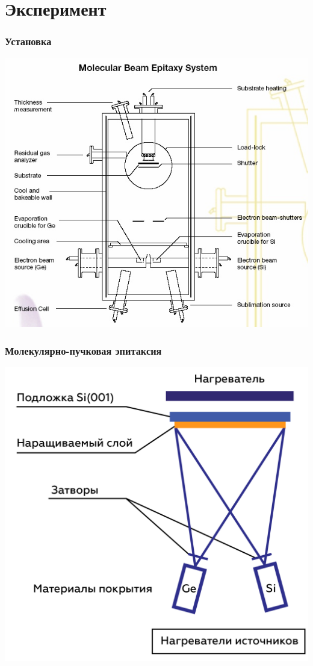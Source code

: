 \documentclass[10pt,pdf,hyperref={unicode}, dvipsnames]{beamer}
\begin{document}
\section{Эксперимент}
\begin{frame}[t]
	\frametitle{Установка}
	\centering
	\includegraphics[width = .8\linewidth]{imgs/exp.jpg}
\end{frame}

\begin{frame}[t]
	\frametitle{Молекулярно-пучковая эпитаксия}
	\centering
	\includegraphics[width = .75\linewidth]{imgs/MBE.png}
\end{frame}
\end{document}
